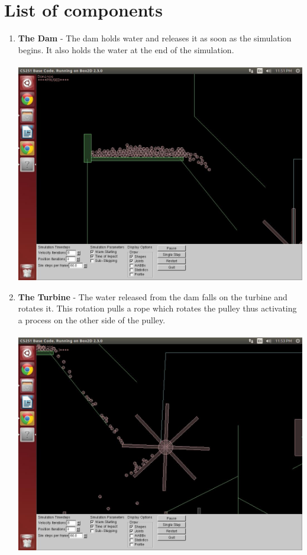 \documentclass{report}
\begin{document}
\section{List of components}
\begin{enumerate}
\item \textbf{The Dam} - The dam holds water and releases it as soon as the simulation begins. It also holds the water at the end of the simulation.\\\\
\includegraphics[scale=0.25]{pics/Dam}
\item \textbf{The Turbine} - The water released from the dam falls on the turbine and rotates it. This rotation pulls a rope which rotates the pulley thus activating a process on the other side of the pulley.\\\\
\includegraphics[scale=0.25]{pics/Turbine}\\
\pagebreak


\end{enumerate}
\end{document}
